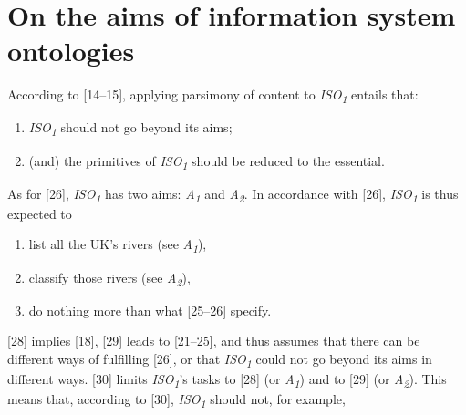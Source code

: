 \section{On the aims of information system ontologies}

According to [14–15], applying parsimony of content to \textit{ISO}\textit{\textsubscript{1}} entails that:



\setcounter{saveenum}{\value{enumi}}

\begin{enumerate}

\setcounter{enumi}{\value{saveenum}}

\item \textit{ISO}\textit{\textsubscript{1}} should not go beyond its aims;

\item (and) the primitives of \textit{ISO}\textit{\textsubscript{1}} should be reduced to the essential.

\end{enumerate}

As for [26], \textit{ISO}\textit{\textsubscript{1}} has two aims: \textit{A}\textit{\textsubscript{1}} and \textit{A}\textit{\textsubscript{2}}. In accordance with [26], \textit{ISO}\textit{\textsubscript{1}} is thus expected to



\setcounter{saveenum}{\value{enumi}}

\begin{enumerate}

\setcounter{enumi}{\value{saveenum}}

\item list all the UK's rivers (see \textit{A}\textit{\textsubscript{1}}),

\item classify those rivers (see \textit{A}\textit{\textsubscript{2}}),

\item do nothing more than what [25–26] specify.

\end{enumerate}

[28] implies [18], [29] leads to [21–25], and thus assumes that there can be different ways of fulfilling [26], or that \textit{ISO}\textit{\textsubscript{1}} could not go beyond its aims in different ways. [30] limits \textit{ISO}\textit{\textsubscript{1}}'s tasks to [28] (or \textit{A}\textit{\textsubscript{1}}) and to [29] (or \textit{A}\textit{\textsubscript{2}}). This means that, according to [30], \textit{ISO}\textit{\textsubscript{1}} should not, for example,



